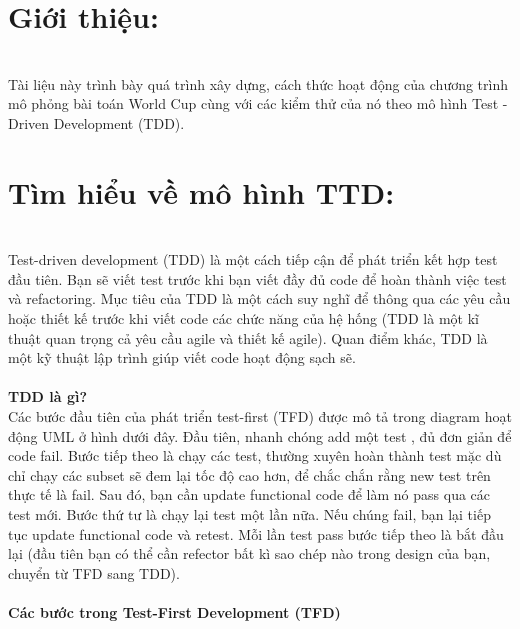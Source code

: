 \documentclass[a4paper]{article}
\begin{document}
\tableofcontents
\newpage
\section{Giới thiệu:}\\
\hspace{0.5cm}Tài liệu này trình bày quá trình xây dựng, cách thức hoạt động của chương trình mô phỏng bài toán World Cup cùng với các kiểm thử của nó theo mô hình Test - Driven Development (TDD).
\section{Tìm hiểu về mô hình TTD:}\\
\hspace{0.5cm}Test-driven development (TDD) là một cách tiếp cận để phát triển kết hợp test đầu tiên. Bạn sẽ viết test trước khi bạn viết đầy đủ code để hoàn thành việc test và refactoring. Mục tiêu của TDD là một cách suy nghĩ để thông qua các yêu cầu hoặc thiết kế trước khi viết code các chức năng của hệ hống (TDD là một kĩ thuật quan trọng cả yêu cầu agile và thiết kế agile). Quan điểm khác, TDD là một kỹ thuật lập trình giúp viết code hoạt động sạch sẽ.\\\\
\textbf{ TDD là gì?}\\
\hspace{0.5cm}Các bước đầu tiên của phát triển test-first (TFD) được mô tả trong diagram hoạt động UML ở hình dưới đây. Đầu tiên, nhanh chóng add một test , đủ đơn giản để code fail. Bước tiếp theo là chạy các test, thường xuyên hoàn thành test mặc dù chỉ chạy các subset sẽ đem lại tốc độ cao hơn, để chắc chắn rằng new test trên thực tế là fail. Sau đó, bạn cần update functional code để làm nó pass qua các test mới. Bước thứ tư là chạy lại test một lần nữa. Nếu chúng fail, bạn lại tiếp tục update functional code và retest. Mỗi lần test pass bước tiếp theo là bắt đầu lại (đầu tiên bạn có thể cần refector bất kì sao chép nào trong design của bạn, chuyển từ TFD sang TDD).\\\\
\textbf{ Các bước trong Test-First Development (TFD)}\\
\end{document}
